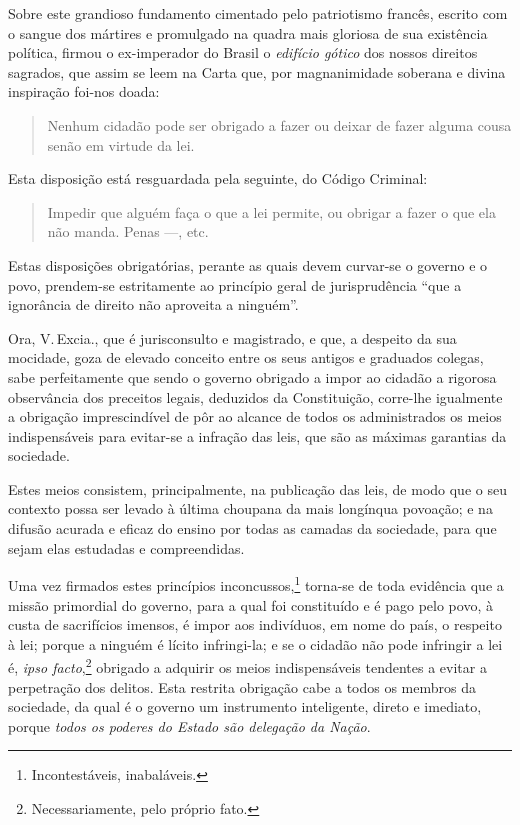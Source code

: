 Sobre este grandioso fundamento cimentado pelo patriotismo francês,
escrito com o sangue dos mártires e promulgado na quadra mais gloriosa
de sua existência política, firmou o ex-imperador do Brasil o
\emph{edifício gótico} dos nossos direitos sagrados, que assim se leem
na Carta que, por magnanimidade soberana e divina inspiração foi-nos
doada:

\begin{quote}
Nenhum cidadão pode ser obrigado a fazer ou deixar de fazer alguma
cousa senão em virtude da lei.
\end{quote}

Esta disposição está resguardada pela seguinte, do Código Criminal:

\begin{quote}
Impedir que alguém faça o que a lei permite, ou obrigar a fazer o que
ela não manda. Penas ---, etc.
\end{quote}

Estas disposições obrigatórias, perante as quais devem curvar-se o
governo e o povo, prendem-se estritamente ao princípio geral de
jurisprudência ``que a ignorância de direito não aproveita a ninguém''.

Ora, V.\,Excia., que é jurisconsulto e magistrado, e que, a despeito da
sua mocidade, goza de elevado conceito entre os seus antigos e graduados
colegas, sabe perfeitamente que sendo o governo obrigado a impor ao
cidadão a rigorosa observância dos preceitos legais, deduzidos da
Constituição, corre-lhe igualmente a obrigação imprescindível de pôr ao
alcance de todos os administrados os meios indispensáveis para evitar-se
a infração das leis, que são as máximas garantias da sociedade.

Estes meios consistem, principalmente, na publicação das leis, de modo
que o seu contexto possa ser levado à última choupana da mais longínqua
povoação; e na difusão acurada e eficaz do ensino por todas as camadas
da sociedade, para que sejam elas estudadas e compreendidas.

Uma vez firmados estes princípios inconcussos,\footnote{Incontestáveis,
  inabaláveis.} torna-se de toda evidência que a missão primordial do
governo, para a qual foi constituído e é pago pelo povo, à custa de
sacrifícios imensos, é impor aos indivíduos, em nome do país, o respeito
à lei; porque a ninguém é lícito infringi-la; e se o cidadão não pode
infringir a lei é, \emph{ipso facto},\footnote{Necessariamente, pelo
  próprio fato.} obrigado a adquirir os meios indispensáveis tendentes
a evitar a perpetração dos delitos. Esta restrita obrigação cabe a todos
os membros da sociedade, da qual é o governo um instrumento inteligente,
direto e imediato, porque \emph{todos os poderes do Estado são delegação
da Nação}.

